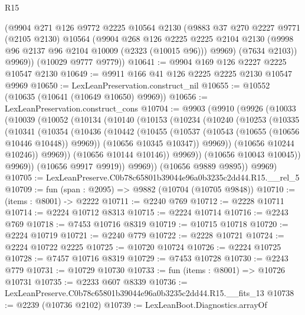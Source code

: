\begin{lexlean}{R15}
\begin{coremodule}
        (@9904
          @271
          @126
          @9772
          @2225
          @10564
          @2130
          (@9883
            @37
            @270
            @2227
            @9771
            (@2105 @2130)
            @10564
            (@9904
              @268
              @126
              @2225
              @2225
              @2104
              @2130
              (@9998 @96 @2137 @96 @2104 @10009 (@2323 (@10015 @96)))
              @9969)
            (@7634 @2103))
          @9969))
      (@10029 @9777 @9779))
@10641 := @9904 @169 @126 @2227 @2225 @10547 @2130
@10649 := @9911 @166 @41 @126 @2225 @2225 @2130 @10547 @9969
@10650 := LexLeanPreservation.construct_nil
@10655 := @10552 (@10635 (@10641 (@10649 @10650) @9969))
@10656 := LexLeanPreservation.construct_cons
@10704 := @9903
    (@9910
      (@9926
        (@10033
          (@10039
            (@10052
              (@10134
                (@10140
                  (@10153
                    (@10234
                      (@10240
                        (@10253
                          (@10335
                            (@10341
                              (@10354
                                (@10436
                                  (@10442
                                    (@10455
                                      (@10537 (@10543 (@10655 (@10656 @10446 @10448)) @9969))
                                      (@10656 @10345 @10347))
                                    @9969))
                                (@10656 @10244 @10246))
                              @9969))
                          (@10656 @10144 @10146))
                        @9969))
                    (@10656 @10043 @10045))
                  @9969))
              (@10656 @9917 @9919))
            @9969))
        (@10656 @9889 @9895))
      @9969)
@10705 := LexLeanPreserve.C0b78c65801b39044e96a0b3235c2dd44.R15.__rel_5
@10709 := fun (span : @2095) => @9882 (@10704 (@10705 @9848))
@10710 := (items : @8001) -> @2222
@10711 := @2240 @769
@10712 := @2228 @10711
@10714 := @2224 @10712 @8313
@10715 := @2224 @10714
@10716 := @2243 @769
@10718 := @7453 @10716 @8319
@10719 := @10715 @10718
@10720 := @2224 @10719
@10721 := @2240 @779
@10722 := @2228 @10721
@10724 := @2224 @10722 @2225
@10725 := @10720 @10724
@10726 := @2224 @10725
@10728 := @7457 @10716 @8319
@10729 := @7453 @10728
@10730 := @2243 @779
@10731 := @10729 @10730
@10733 := fun (items : @8001) => @10726 @10731
@10735 := @2233 @607 @8339
@10736 := LexLeanPreserve.C0b78c65801b39044e96a0b3235c2dd44.R15.__fits_13
@10738 := @2239 (@10736 @2102)
@10739 := LexLeanBoot.Diagnostics.arrayOf

\end{coremodule}
\end{lexlean}
